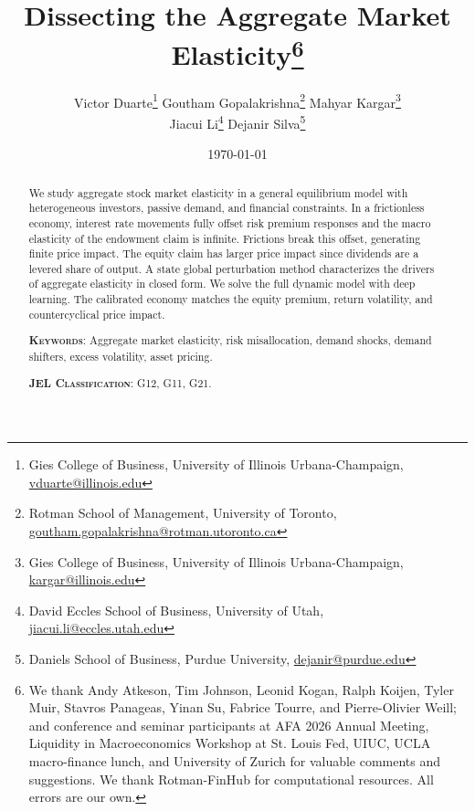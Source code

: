 \documentclass[12pt,english]{article}
\title{\textbf{Dissecting the Aggregate Market Elasticity\thanks{We thank Andy Atkeson, Tim Johnson, Leonid Kogan, Ralph Koijen, Tyler Muir, Stavros Panageas, Yinan Su, Fabrice Tourre, and Pierre-Olivier Weill; and conference and seminar participants at AFA 2026 Annual Meeting, Liquidity in Macroeconomics Workshop at St. Louis Fed, UIUC, UCLA macro-finance lunch, and University of Zurich for valuable comments and suggestions.
We thank Rotman-FinHub for computational resources.
All errors are our own.}}}
\author{%
\begin{tabular}[t]{@{}c@{}}
Victor Duarte\thanks{Gies College of Business, University of Illinois Urbana-Champaign, \href{mailto:vduarte@illinois.edu}{vduarte@illinois.edu}}
\quad Goutham Gopalakrishna\thanks{Rotman School of Management, University of Toronto, \href{mailto:goutham.gopalakrishna@rotman.utoronto.ca}{goutham.gopalakrishna@rotman.utoronto.ca}}
\quad Mahyar Kargar\thanks{Gies College of Business, University of Illinois Urbana-Champaign, \href{mailto:kargar@illinois.edu}{kargar@illinois.edu}}\\[0.75em]
Jiacui Li\thanks{David Eccles School of Business, University of Utah, \href{mailto:jiacui.li@eccles.utah.edu}{jiacui.li@eccles.utah.edu}}
\quad Dejanir Silva\thanks{Daniels School of Business, Purdue University, \href{dejanir@purdue.edu}{dejanir@purdue.edu}}
\end{tabular}%
}
\date{\today}
\begin{document}
  \sloppy
  \maketitle
  \thispagestyle{empty}
  
  \begin{abstract} 
  \noindent 
  We study aggregate stock market elasticity in a general equilibrium model with heterogeneous investors, passive demand, and financial constraints.
  In a frictionless economy, interest rate movements fully offset risk premium responses and the macro elasticity of the endowment claim is infinite.
  Frictions break this offset, generating finite price impact.
  The equity claim has larger price impact since dividends are a levered share of output.
  A state global perturbation method characterizes the drivers of aggregate elasticity in closed form.
  We solve the full dynamic model with deep learning.
  The calibrated economy matches the equity premium, return volatility, and countercyclical price impact.  
  \vspace{5mm} 
  \bigskip
  
  \noindent 
  \textsc{\textbf{Keywords}}: Aggregate market elasticity, risk misallocation, demand shocks, demand shifters, excess volatility, asset pricing. 
  
  \medskip
  \noindent
  \textsc{\textbf{JEL Classification}}: G12, G11, G21.   
\end{abstract}
	
\end{document}
